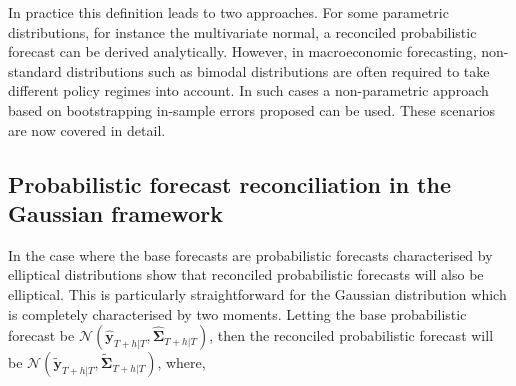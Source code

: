 \documentclass[graybox]{svmult}
\begin{document}
In practice this definition leads to two approaches.  For some parametric distributions, for instance the multivariate normal,  a reconciled probabilistic forecast can be derived analytically.  However, in macroeconomic forecasting, non-standard distributions such as bimodal distributions are often required to take different policy regimes into account.  In such cases a non-parametric approach based on bootstrapping in-sample errors proposed \cite{GamEtAl2018} can be used.  These scenarios are now covered in detail.

\subsection{Probabilistic forecast reconciliation in the Gaussian framework}\label{sec:probrecgauss}



In the case where the base forecasts are probabilistic forecasts characterised by elliptical distributions \cite{GamEtAl2018} show that reconciled probabilistic forecasts will also be elliptical.  This is particularly straightforward for the Gaussian distribution which is completely characterised by two moments.  Letting the base probabilistic forecast be $\mathscr{N}(\bm{\hat{y}}_{T+h|T}, \hat{\bm{\Sigma}}_{T+h|T})$, then the reconciled probabilistic forecast will be $\mathscr{N}(\bm{\tilde{y}}_{T+h|T}, \tilde{\bm{\Sigma}}_{T+h|T})$, where,
\end{document}
